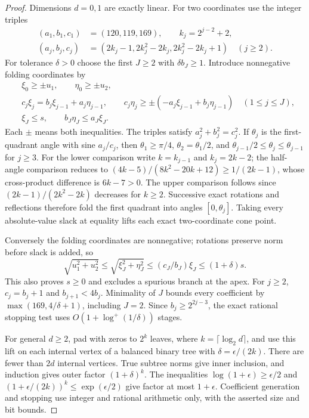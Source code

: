 \begin{proof}
Dimensions $d=0,1$ are exactly linear. For two coordinates use the
integer triples
\begin{align*}
 (a_1,b_1,c_1)&=(120,119,169),\qquad k_j=2^{j-2}+2,\\
 (a_j,b_j,c_j)&=(2k_j-1,2k_j^2-2k_j,2k_j^2-2k_j+1)
                  \quad(j\ge2).
\end{align*}
For tolerance $\delta>0$ choose the first $J\ge2$ with
$\delta b_J\ge1$. Introduce nonnegative folding coordinates by
\begin{align*}
 &\xi_0\ge\pm u_1,\qquad\eta_0\ge\pm u_2,\\
 &c_j\xi_j=b_j\xi_{j-1}+a_j\eta_{j-1},\qquad
 c_j\eta_j\ge\pm(-a_j\xi_{j-1}+b_j\eta_{j-1})\quad(1\le j\le J),\\
 &\xi_J\le s,\qquad b_J\eta_J\le a_J\xi_J.
\end{align*}
Each $\pm$ means both inequalities. The triples satisfy
$a_j^2+b_j^2=c_j^2$. If $\theta_j$ is the first-quadrant angle with
sine $a_j/c_j$, then $\theta_1\ge\pi/4$,
$\theta_2=\theta_1/2$, and
$\theta_{j-1}/2\le\theta_j\le\theta_{j-1}$ for $j\ge3$.
For the lower comparison write $k=k_{j-1}$ and $k_j=2k-2$;
the half-angle comparison reduces to
$(4k-5)/(8k^2-20k+12)\ge1/(2k-1)$, whose cross-product difference
is $6k-7>0$. The upper comparison follows since
$(2k-1)/(2k^2-2k)$ decreases for $k\ge2$.
Successive exact rotations and reflections therefore fold the first
quadrant into angles $[0,\theta_j]$. Taking every absolute-value slack
at equality lifts each exact two-coordinate cone point.

Conversely the folding coordinates are nonnegative; rotations preserve
norm before slack is added, so
\[
 \sqrt{u_1^2+u_2^2}\le\sqrt{\xi_J^2+\eta_J^2}
       \le(c_J/b_J)\xi_J\le(1+\delta)s.
\]
This also proves $s\ge0$ and excludes a spurious branch at the apex.
For $j\ge2$, $c_j=b_j+1$ and $b_{j+1}<4b_j$. Minimality of $J$
bounds every coefficient by $\max(169,4/\delta+1)$, including $J=2$.
Since $b_j\ge2^{2j-3}$, the exact rational stopping test uses
$O(1+\log^+(1/\delta))$ stages.

For general $d\ge2$, pad with zeros to $2^k$ leaves, where
$k=\lceil\log_2d\rceil$, and use this lift on each internal vertex
of a balanced binary tree with $\delta=\epsilon/(2k)$.
There are fewer than $2d$ internal vertices. True subtree norms give inner
inclusion, and induction gives outer factor $(1+\delta)^k$.
The inequalities $\log(1+\epsilon)\ge\epsilon/2$ and
$(1+\epsilon/(2k))^k\le\exp(\epsilon/2)$ give factor at most
$1+\epsilon$. Coefficient generation and stopping use integer and
rational arithmetic only, with the asserted size and bit bounds.
\end{proof}

